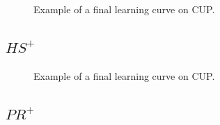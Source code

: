 \begin{appendices}
                \begin{figure}[H]
                    \centering
                        \label{fig:cup_mhs}
                    \caption{Example of a final learning curve on CUP.}
                \end{figure}

            \subsection{$HS^+$}
            \label{sec:cup_hs}

                \begin{figure}[H]
                    \centering
                        \label{fig:cup_hs}
                    \caption{Example of a final learning curve on CUP.}
                \end{figure}

            \subsection{$PR^+$}
            \label{sec:cup_pr}


\end{appendices}
